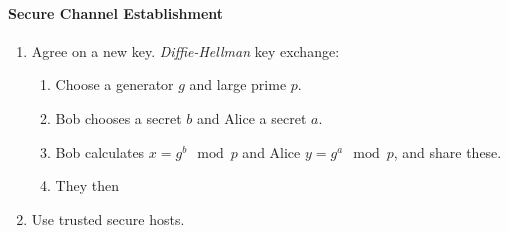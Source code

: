 \documentclass[twocolumn,english]{article}
\begin{document}
\paragraph{Secure Channel Establishment}
\begin{enumerate}
\item Agree on a new key. \emph{Diffie-Hellman} key exchange:
\begin{enumerate}
\item Choose a generator $g$ and large prime $p$.
\item Bob chooses a secret $b$ and Alice a secret $a$.
\item Bob calculates $x=g^{b}\mod p$ and Alice $y=g^{a}\mod p$, and share
these.
\item They then
\end{enumerate}
\item Use trusted secure hosts.
\end{enumerate}
\end{document}
